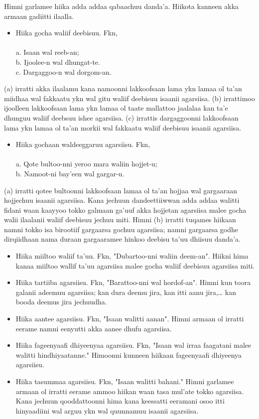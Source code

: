 \documentclass[11pt,b5paper]{book}
\begin{document}
Himni garlamee hiika adda addaa qabaachuu danda’a. Hiikota kanneen akka armaan gadiitti ilaalla.

\begin{itemize}
	\item Hiika gocha waliif deebisuu. Fkn, \\
	\\
	a. Isaan wal reeb-an; \\
	b. Ijoolee-n wal dhungat-te.\\
	c. Dargaggoo-n wal dorgom-an.\\
\end{itemize}
(a) irratti akka ilaalamu kana namoonni lakkoofsaan lama ykn lamaa ol ta’an miidhaa wal fakkaatu ykn wal gitu waliif deebisuu isaanii agarsiisa. (b) irrattimoo ijoolleen lakkoofsaan lama ykn lamaa ol taate mallattoo jaalalaa kan ta’e dhunguu waliif deebsuu ishee agarsiisa. (c) irrattis dargaggoonni
lakkoofsaan lama ykn lamaa ol ta’an morkii wal fakkaatu waliif deebisuu isaanii agarsiisa. 
\begin{itemize}
	\item Hiika gochaan waldeeggaruu agarsiisu. Fkn,\\
	\\
	a. Qote bultoo-nni yeroo mara waliin hojjet-u;\\
	b. Namoot-ni bay’een wal gargar-u. \\
\end{itemize}
(a) irratti qotee bultoonni lakkoofsaan lamaa ol ta’an hojjaa wal gargaaraan hojjechuu isaanii agarsiisa. Kana jechuun dandeettiiwwan adda addaa walitti fidani waan kaayyoo tokko
galmaan ga’uuf akka hojjetan agarsiisa malee gocha walii ilaalanii waliif deebisuu jechuu miti. Himni (b) irratti tuqames hiikaan namni tokko isa birootiif gargaarsa gochuu agarsiisa;
namni gargaarsa godhe dirqiidhaan nama duraan gargaaramee hinkoo deebisu ta’uu dhiisuu danda’a. 
\begin{itemize}
	\item Hiika miiltoo waliif ta’uu. Fkn, "Dubartoo-nni waliin deem-an". Hiikni hima kanaa miiltoo wallif ta’uu agarsiisa malee gocha waliif deebisuu agarsiisa miti.
	\item Hiika tartiiba agarsiisu. Fkn, "Barattoo-nni wal hordof-an". Himni kun toora galanii adeemuu agarsiisa; kan dura deemu jira, kan itti aanu jira,… kan booda deemus jira jechuudha.
	\item Hiika aantee agarsiisu. Fkn, "Isaan walitti aanan". Himni armaan ol irratti eerame namni eenyutti akka aanee dhufu agarsiisa. 
	\item Hiika fageenyaafi dhiyeenyaa agarsiisu. Fkn, "Isaan wal irraa faagatani malee walitti hindhiyaatanne." Himoonni kunneen hiikaan fageenyaafi dhiyeenya agarsiisu. 
	\item Hiika tasummaa agarsiisu. Fkn, "Isaan walitti bahani." Himni garlamee armaan ol irratti eerame ammoo hiikan waan tasa mul’ate tokko agarsiisa. Kana jechuun qooddattoonni hima kana keessatti eeramani osoo itti hinyaadiini wal arguu ykn wal quunnamuu isaanii agarsiisa. 
\end{itemize}
	
\end{document}
